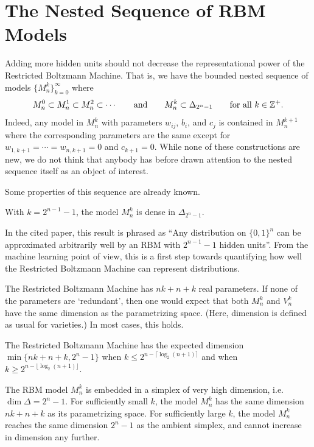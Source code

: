 \documentclass[cclicense]{hmcthesis}
\numberwithin{equation}{section}
\begin{document}
\section{The Nested Sequence of RBM Models}

    Adding more hidden units should not decrease the representational power of
    the Restricted Boltzmann Machine.  That is, we have the bounded nested
    sequence of models $\{M_n^k\}_{k=0}^\infty$ where
    \[
        M_n^0 \subset M_n^1 \subset M_n^2 \subset \cdots 
        \qquad\text{and}\qquad
        M_n^k \subset \Delta_{2^n-1}
        \qquad\text{for all $k \in \mathbb{Z}^+$}.
    \]
    Indeed, any model in $M_n^k$ with parameters $w_{ij}$, $b_i$, and $c_j$ is
    contained in $M_n^{k+1}$ where the corresponding parameters are the same
    except for $w_{1,k+1} = \cdots = w_{n, k+1} = 0$  and $c_{k+1} = 0$.  While
    none of these constructions are new, we do not think that anybody has before
    drawn attention to the nested sequence itself as an object of interest.

    Some properties of this sequence are already known.
    \begin{theorem} \label{thm:approximator}
    With $k = 2^{n-1} - 1$, the model $M_n^k$ is dense in $\Delta_{2^n - 1}$.
    \end{theorem}
    In the cited paper, this result is phrased as ``Any distribution on
    $\{0,1\}^n$ can be approximated arbitrarily well by an RBM with $2^{n-1} -
    1$ hidden units''.  From the machine learning point of view, this is a first
    step towards quantifying how well the Restricted Boltzmann Machine can
    represent distributions.

    The Restricted Boltzmann Machine has $nk+n+k$ real parameters.  If none of
    the parameters are `redundant', then one would expect that both $M_n^k$ and
    $V_n^k$ have the same dimension as the parametrizing space.  (Here,
    dimension is defined as usual for varieties.) In most cases, this holds.
    \begin{theorem} \label{thm:dimension}
    The Restricted Boltzmann Machine has the expected dimension
    $\min\{nk+n+k, 2^n-1\}$ when $k \le 2^{n-\lceil \log_2(n+1)\rceil}$ and
    when $k \ge 2^{n-\lfloor\log_2(n+1)\rfloor}$.
    \end{theorem}
    \noindent The RBM model $M_n^k$ is embedded in a simplex of very high
    dimension, i.e. $\dim \Delta = 2^n-1$.  For sufficiently small $k$, the
    model $M_n^k$ has the same dimension $nk+n+k$ as its parametrizing space.
    For sufficiently large $k$, the model $M_n^k$ reaches the same dimension
    $2^n-1$ as the ambient simplex, and cannot increase in dimension any
    further.
\end{document}
